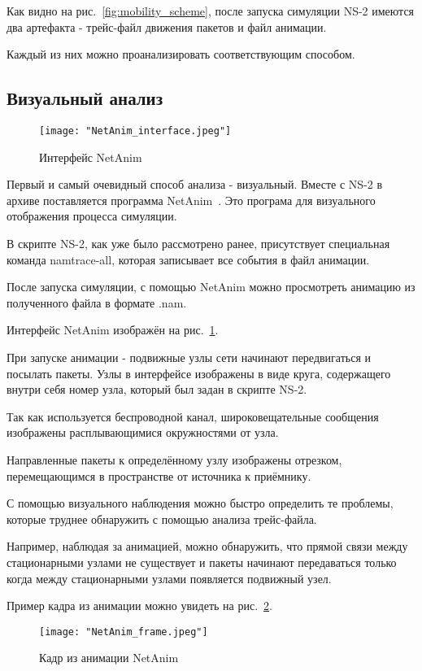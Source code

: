 Как видно на рис.~\ref{fig:mobility_scheme}, после запуска симуляции NS-2 имеются два артефакта - трейс-файл движения пакетов и файл анимации.

Каждый из них можно проанализировать соответствующим способом. 

\subsection*{Визуальный анализ}

\begin{figure}[!h]
  \centering
  \texttt{[image: "NetAnim\_interface.jpeg"]}
  \caption{Интерфейс NetAnim}
  \label{fig:netanim_interface}
\end{figure}

Первый и самый очевидный способ анализа - визуальный. Вместе с NS-2 в архиве  поставляется программа NetAnim~\cite{netanim}. Это програма для визуального отображения процесса симуляции.

В скрипте NS-2, как уже было рассмотрено ранее, присутствует специальная команда namtrace-all, которая записывает все события в файл анимации. 

После запуска симуляции, с помощью NetAnim можно просмотреть анимацию из полученного файла в формате .nam.

Интерфейс NetAnim изображён на рис.~\ref{fig:netanim_interface}.

При запуске анимации - подвижные узлы сети начинают передвигаться и посылать пакеты. Узлы в интерфейсе изображены в виде круга, содержащего внутри себя номер узла, который был задан в скрипте NS-2. 

Так как используется беспроводной канал, широковещательные сообщения изображены расплывающимися окружностями от узла. 

Направленные пакеты к определённому узлу изображены отрезком, перемещающимся в пространстве от источника к приёмнику.

С помощью визуального наблюдения можно быстро определить те проблемы, которые труднее обнаружить с помощью анализа трейс-файла. 

Например, наблюдая за анимацией, можно обнаружить, что прямой связи между стационарными узлами не существует и пакеты начинают передаваться только когда между стационарными узлами появляется подвижный узел.

Пример кадра из анимации можно увидеть на рис.~\ref{fig:netanim_frame}.

\begin{figure}[!h]
  \centering
  \texttt{[image: "NetAnim\_frame.jpeg"]}
  \caption{Кадр из анимации NetAnim}
  \label{fig:netanim_frame}
\end{figure}


